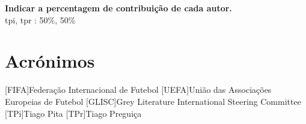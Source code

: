 \documentclass{report}
\begin{document}
\vspace{10pt}
\textbf{Indicar a percentagem de contribuição de cada autor.}\\

\ac{tpi}, \ac{tpr} : 50\%, 50\%\\

\chapter*{Acrónimos}
\begin{acronym}
    [FIFA]{Federação Internacional de Futebol}
    [UEFA]{União das Associações Europeias de Futebol}
    [GLISC]{Grey Literature International Steering Committee}
    [TPi]{Tiago Pita}
    [TPr]{Tiago Preguiça}
\end{acronym}


\printbibliography
\end{document}
